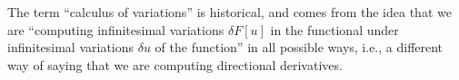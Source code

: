 The term ``calculus of variations'' is historical, and comes from the
idea that we are ``computing infinitesimal variations $\delta F[u]$ in
the functional under infinitesimal variations $\delta u$ of the
function'' in all possible ways, i.e., a different way of saying that
we are computing directional derivatives. 



